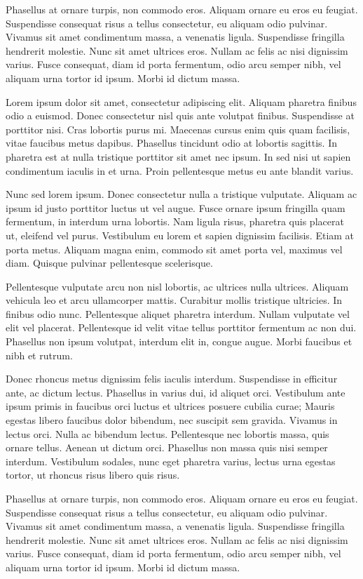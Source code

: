 \documentclass[noexaminfo]{sapthesis}  %
\begin{document}
Phasellus at ornare turpis, non commodo eros. Aliquam ornare eu eros eu feugiat. Suspendisse consequat risus a tellus consectetur, eu aliquam odio pulvinar. Vivamus sit amet condimentum massa, a venenatis ligula. Suspendisse fringilla hendrerit molestie. Nunc sit amet ultrices eros. Nullam ac felis ac nisi dignissim varius. Fusce consequat, diam id porta fermentum, odio arcu semper nibh, vel aliquam urna tortor id ipsum. Morbi id dictum massa. 

Lorem ipsum dolor sit amet, consectetur adipiscing elit. Aliquam pharetra finibus odio a euismod. Donec consectetur nisl quis ante volutpat finibus. Suspendisse at porttitor nisi. Cras lobortis purus mi. Maecenas cursus enim quis quam facilisis, vitae faucibus metus dapibus. Phasellus tincidunt odio at lobortis sagittis. In pharetra est at nulla tristique porttitor sit amet nec ipsum. In sed nisi ut sapien condimentum iaculis in et urna. Proin pellentesque metus eu ante blandit varius.

Nunc sed lorem ipsum. Donec consectetur nulla a tristique vulputate. Aliquam ac ipsum id justo porttitor luctus ut vel augue. Fusce ornare ipsum fringilla quam fermentum, in interdum urna lobortis. Nam ligula risus, pharetra quis placerat ut, eleifend vel purus. Vestibulum eu lorem et sapien dignissim facilisis. Etiam at porta metus. Aliquam magna enim, commodo sit amet porta vel, maximus vel diam. Quisque pulvinar pellentesque scelerisque.

Pellentesque vulputate arcu non nisl lobortis, ac ultrices nulla ultrices. Aliquam vehicula leo et arcu ullamcorper mattis. Curabitur mollis tristique ultricies. In finibus odio nunc. Pellentesque aliquet pharetra interdum. Nullam vulputate vel elit vel placerat. Pellentesque id velit vitae tellus porttitor fermentum ac non dui. Phasellus non ipsum volutpat, interdum elit in, congue augue. Morbi faucibus et nibh et rutrum.

Donec rhoncus metus dignissim felis iaculis interdum. Suspendisse in efficitur ante, ac dictum lectus. Phasellus in varius dui, id aliquet orci. Vestibulum ante ipsum primis in faucibus orci luctus et ultrices posuere cubilia curae; Mauris egestas libero faucibus dolor bibendum, nec suscipit sem gravida. Vivamus in lectus orci. Nulla ac bibendum lectus. Pellentesque nec lobortis massa, quis ornare tellus. Aenean ut dictum orci. Phasellus non massa quis nisi semper interdum. Vestibulum sodales, nunc eget pharetra varius, lectus urna egestas tortor, ut rhoncus risus libero quis risus.

Phasellus at ornare turpis, non commodo eros. Aliquam ornare eu eros eu feugiat. Suspendisse consequat risus a tellus consectetur, eu aliquam odio pulvinar. Vivamus sit amet condimentum massa, a venenatis ligula. Suspendisse fringilla hendrerit molestie. Nunc sit amet ultrices eros. Nullam ac felis ac nisi dignissim varius. Fusce consequat, diam id porta fermentum, odio arcu semper nibh, vel aliquam urna tortor id ipsum. Morbi id dictum massa. 

\backmatter
\cleardoublepage
\end{document}
